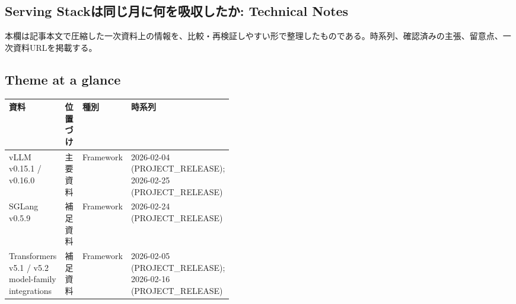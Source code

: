 \subsection*{Serving Stackは同じ月に何を吸収したか: Technical Notes}
本欄は記事本文で圧縮した一次資料上の情報を、比較・再検証しやすい形で整理したものである。時系列、確認済みの主張、留意点、一次資料URLを掲載する。
\medskip
\subsection*{Theme at a glance}
\begin{center}
\footnotesize
\begin{tabularx}{\linewidth}{@{}p{0.20\linewidth}p{0.10\linewidth}p{0.14\linewidth}X@{}}
\toprule
資料 & 位置づけ & 種別 & 時系列 \\
\midrule
vLLM v0.15.1 / v0.16.0 & 主要資料 & Framework & 2026-02-04 (PROJECT\_RELEASE); 2026-02-25 (PROJECT\_RELEASE) \\
SGLang v0.5.9 & 補足資料 & Framework & 2026-02-24 (PROJECT\_RELEASE) \\
Transformers v5.1 / v5.2 model-family integrations & 補足資料 & Framework & 2026-02-05 (PROJECT\_RELEASE); 2026-02-16 (PROJECT\_RELEASE) \\
\bottomrule
\end{tabularx}
\end{center}
\normalsize

